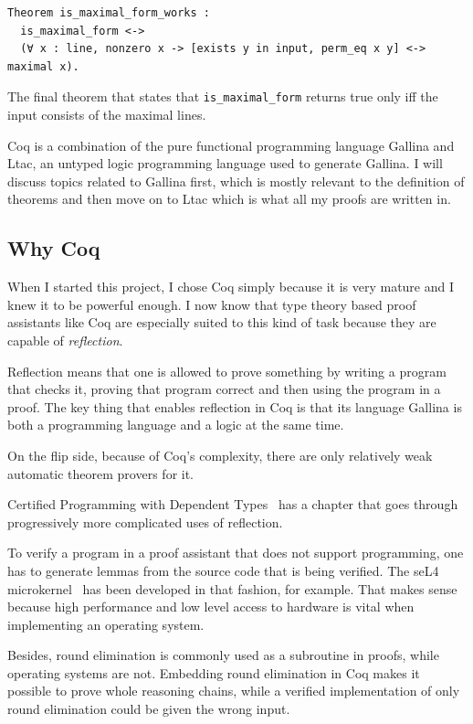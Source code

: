 \documentclass[english, 12pt, a4paper, sci, a-1b, online]{aaltothesis}
\newcommand\icoq[1]{\texttt{#1}}
\begin{document}
\begin{listing}[h]
\begin{verbatim}
Theorem is_maximal_form_works :
  is_maximal_form <->
  (∀ x : line, nonzero x -> [exists y in input, perm_eq x y] <-> maximal x).
\end{verbatim}
\caption{The final theorem that states that \icoq{is_maximal_form} returns true only iff the input consists of the maximal lines.}
\end{listing}

Coq is a combination of the pure functional programming language Gallina and Ltac, an untyped logic programming language used to generate Gallina. I will discuss topics related to Gallina first, which is mostly relevant to the definition of theorems and then move on to Ltac which is what all my proofs are written in.

\subsection{Why Coq}

When I started this project, I chose Coq simply because it is very mature and I knew it to be powerful enough. I now know that type theory based proof assistants like Coq are especially suited to this kind of task because they are capable of \emph{reflection}.

Reflection means that one is allowed to prove something by writing a program that checks it, proving that program correct and then using the program in a proof. The key thing that enables reflection in Coq is that its language Gallina is both a programming language and a logic at the same time.

On the flip side, because of Coq's complexity, there are only relatively weak automatic theorem provers for it.

Certified Programming with Dependent Types~\cite{CPDT} has a chapter that goes through progressively more complicated uses of reflection.

To verify a program in a proof assistant that does not support programming, one has to generate lemmas from the source code that is being verified. The seL4 microkernel~\cite{sel4} has been developed in that fashion, for example. That makes sense because high performance and low level access to hardware is vital when implementing an operating system.

Besides, round elimination is commonly used as a subroutine in proofs, while operating systems are not. Embedding round elimination in Coq makes it possible to prove whole reasoning chains, while a verified implementation of only round elimination could be given the wrong input.
\end{document}
